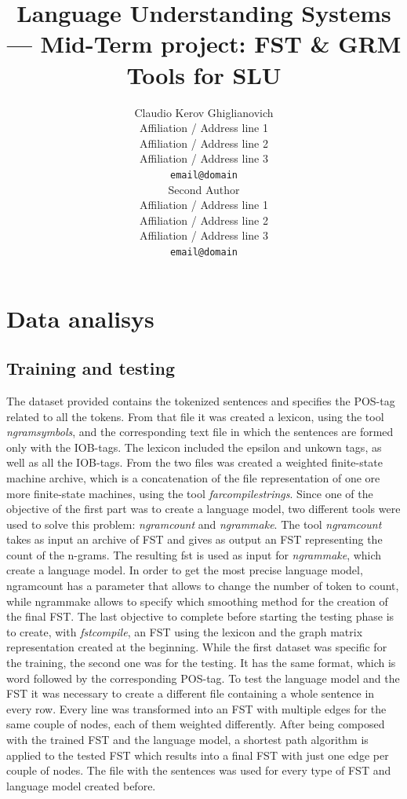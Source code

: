 \documentclass[11pt,a4paper]{article}
\title{Language Understanding Systems --- Mid-Term project: FST \& GRM Tools for SLU}
\author{Claudio Kerov Ghiglianovich \\
  Affiliation / Address line 1 \\
  Affiliation / Address line 2 \\
  Affiliation / Address line 3 \\
  {\tt email@domain} \\\And
  Second Author \\
  Affiliation / Address line 1 \\
  Affiliation / Address line 2 \\
  Affiliation / Address line 3 \\
  {\tt email@domain} \\}
\date{}
\begin{document}
\maketitle
\begin{abstract}

\end{abstract}

%
\section{Data analisys}
\subsection*{Training and testing}
The dataset provided contains the tokenized sentences and specifies the POS-tag related to all the tokens. From that file it was created a lexicon, using the tool \textit{ngramsymbols}, and the corresponding text file in which the sentences are formed only with the IOB-tags. The lexicon included the epsilon and unkown tags, as well as all the IOB-tags. From the two files was created a weighted finite-state machine archive, which is a concatenation of the file representation of one ore more finite-state machines, using the tool \textit{farcompilestrings}. Since one of the objective of the first part was to create a language model, two different tools were used to solve this problem: \textit{ngramcount} and \textit{ngrammake}. The tool \textit{ngramcount} takes as input an archive of FST and gives as output an FST representing the count of the n-grams. The resulting fst is used as input for \textit{ngrammake}, which create a language model. In order to get the most precise language model, ngramcount has a parameter that allows to change the number of token to count, while ngrammake allows to specify which smoothing method for the creation of the final FST. The last objective to complete before starting the testing phase is to create, with \textit{fstcompile}, an FST using the lexicon and the graph matrix representation created at the beginning.
While the first dataset was specific for the training, the second one was for the testing. It has the same format, which is word followed by the corresponding POS-tag. To test the language model and the FST it was necessary to create a different file containing a whole sentence in every row. Every line was transformed into an FST with multiple edges for the same couple of nodes, each of them weighted differently. After being composed with the trained FST and the language model, a shortest path algorithm is applied to the tested FST which results into a final FST with just one edge per couple of nodes. The file with the sentences was used for every type of FST and language model created before. 
\end{document}
